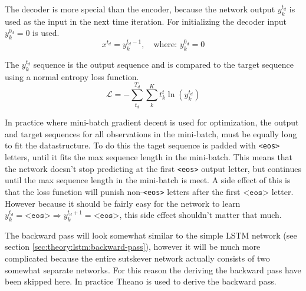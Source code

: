 The decoder is more special than the encoder, because the network output $y_k^{t_d}$ is used as the input in the next time iteration. For initializing the decoder input $y_k^{0_d} = 0$ is used.
\begin{equation}
x^{t_d} = y_k^{t_d - 1}, \quad \text{where: } y_k^{0_d} = 0
\end{equation}

The $y_k^{t_d}$ sequence is the output sequence and is compared to the target sequence using a normal entropy loss function.
\begin{equation}
\mathcal{L} = - \sum_{t_d}^{T_d} \sum_{k}^K t_k^t \ln(y_k^{t_d})
\end{equation}

In practice where mini-batch gradient decent is used for optimization, the output and target sequences for all observations in the mini-batch, must be equally long to fit the datastructure. To do this the taget sequence is padded with \texttt{<eos>} letters, until it fits the max sequence length in the mini-batch. This means that the network doesn't stop predicting at the first \texttt{<eos>} output letter, but continues until the max sequence  length in the mini-batch is meet. A side effect of this is that the loss function will punish non-\texttt{<eos>} letters after the first $\texttt{<eos>}$ letter. However because it should be fairly easy for the network to learn $y_k^{t_d} = \texttt{<eos>} \Rightarrow y_k^{t_d+1} = \texttt{<eos>}$, this side effect shouldn't matter that much.

The backward pass will look somewhat similar to the simple LSTM network (see section \ref{sec:theory:lstm:backward-pass}), however it will be much more complicated because the entire sutskever network actually consists of two somewhat separate networks. For this reason the deriving the backward pass have been skipped here. In practice Theano \cite{theano-a, theano-b} is used to derive the backward pass.
